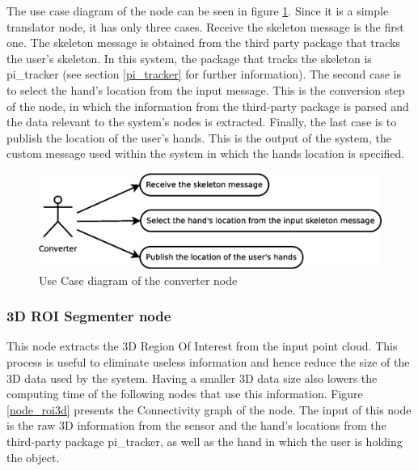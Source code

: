 	The use case diagram of the node can be seen in figure \ref{uc_converter}. 
	Since it is a simple translator node, it has only three cases. 
	Receive the skeleton message is the first one. 
	The skeleton message is obtained from the third party package that tracks the user's skeleton.
	In this system, the package that tracks the skeleton is pi\_tracker (see section \ref{pi_tracker} for further information). 
	The second case is to select the hand's location from the input message. 
	This is the conversion step of the node, in which the information from the third-party package is parsed and the data relevant to the system's nodes is extracted. 
	Finally, the last case is to publish the location of the user's hands. 
	This is the output of the system, the custom message used within the system in which the hands location is specified. 
	\begin{figure}[H]
		\centering
		\includegraphics[scale=0.4]{img/diagrams/uc_converter.eps}
		\caption[Use case diagram converter node]{Use Case diagram of the converter node}
		\label{uc_converter}
	\end{figure}

	

\subsubsection{3D ROI Segmenter node}
	\label{roi_segmenter_3d}

	This node extracts the 3D Region Of Interest from the input point cloud. 
	This process is useful to eliminate useless information and hence reduce the size of the 3D data used by the system.  
	Having a smaller 3D data size also lowers the computing time of the following nodes that use this information. 
	Figure  \ref{node_roi3d} presents the Connectivity graph of the node. 
	The input of this node is the raw 3D information from the sensor and the hand's locations from the third-party package pi\_tracker, as well as the hand in which the user is holding the object. 

